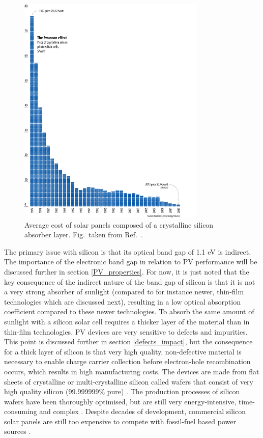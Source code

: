 \documentclass[11pt, twoside]{report}
\begin{document}
\begin{figure}[h!]
  \centering
    \includegraphics[width=0.8\textwidth]{figures/Si_cost.jpg}
    \caption[Average cost of solar panels composed of a crystalline silicon absorber layer.]{Average cost of solar panels composed of a crystalline silicon absorber layer. Fig.~taken from Ref.~.}
  \label{Si_cost}
\end{figure}

The primary issue with silicon is that its optical band gap of 1.1 eV is indirect. The importance of the electronic band gap in relation to PV performance will be discussed further in section \ref{PV_properties}. For now, it is just noted that the key consequence of the indirect nature of the band gap of silicon is that it is not a very strong absorber of sunlight (compared to for instance newer, thin-film technologies which are discussed next), resulting in a low optical absorption coefficient  compared to these newer technologies. To absorb the same amount of sunlight with a silicon solar cell requires a thicker layer of the material than in thin-film technologies. PV devices are very sensitive to defects and impurities. This point is discussed further in section \ref{defects_impact}, but the consequence for a thick layer of silicon is that very high quality, non-defective material is necessary to enable charge carrier collection before electron-hole recombination occurs, which results in high manufacturing costs. The devices are made from flat sheets of crystalline or multi-crystalline silicon called wafers that consist of very high quality silicon (99.999999\% pure) 
\cite{sus_book_5}.
The production processes of silicon wafers have been thoroughly optimised, but are still very energy-intensive, time-consuming and complex \cite{emerging_pv}.
Despite decades of development, commercial silicon solar panels are still too expensive to compete with fossil-fuel based power sources \cite{FE_PV_rev1_5}. 
\end{document}
